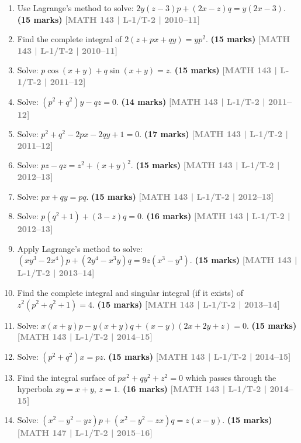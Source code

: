 \documentclass[12pt,a4paper]{article}
\newcommand{\yr}[1]{\hfill\textcolor{gray}{\small\textbf{[#1]}}}
\newcommand{\mk}[1]{\textcolor{orange!70!black}{\small\textbf{(#1 marks)}}}
\begin{document}
\begin{enumerate}

\item Use Lagrange's method to solve: $2y(z-3)p+(2x-z)q=y(2x-3)$.
\mk{15} \yr{MATH 143 | L-1/T-2 | 2010--11}

\item Find the complete integral of $2(z+px+qy)=yp^{2}$.
\mk{15} \yr{MATH 143 | L-1/T-2 | 2010--11}

\item Solve: $p\cos(x+y)+q\sin(x+y)=z$.
\mk{15} \yr{MATH 143 | L-1/T-2 | 2011--12}

\item Solve: $(p^{2}+q^{2})y-qz=0$.
\mk{14} \yr{MATH 143 | L-1/T-2 | 2011--12}

\item Solve: $p^{2}+q^{2}-2px-2qy+1=0$.
\mk{17\textonehalf} \yr{MATH 143 | L-1/T-2 | 2011--12}

\item Solve: $pz-qz=z^{2}+(x+y)^{2}$.
\mk{15} \yr{MATH 143 | L-1/T-2 | 2012--13}

\item Solve: $px+qy=pq$.
\mk{15} \yr{MATH 143 | L-1/T-2 | 2012--13}

\item Solve: $p(q^{2}+1)+(3-z)q=0$.
\mk{16\textonehalf} \yr{MATH 143 | L-1/T-2 | 2012--13}

\item Apply Lagrange's method to solve: $(xy^{3}-2x^{4})p+(2y^{4}-x^{3}y)q=9z(x^{3}-y^{3})$.
\mk{15} \yr{MATH 143 | L-1/T-2 | 2013--14}

\item Find the complete integral and singular integral (if it exists) of $z^{2}(p^{2}+q^{2}+1)=4$.
\mk{15} \yr{MATH 143 | L-1/T-2 | 2013--14}

\item Solve: $x(x+y)p-y(x+y)q+(x-y)(2x+2y+z)=0$.
\mk{15} \yr{MATH 143 | L-1/T-2 | 2014--15}

\item Solve: $(p^{2}+q^{2})x=pz$.
\mk{15} \yr{MATH 143 | L-1/T-2 | 2014--15}

\item Find the integral surface of $px^{2}+qy^{2}+z^{2}=0$ which passes through the hyperbola $xy=x+y$, $z=1$.
\mk{16\textonehalf} \yr{MATH 143 | L-1/T-2 | 2014--15}

\item Solve: $(x^{2}-y^{2}-yz)p+(x^{2}-y^{2}-zx)q=z(x-y)$.
\mk{15} \yr{MATH 147 | L-1/T-2 | 2015--16}


\end{enumerate}
\end{document}
